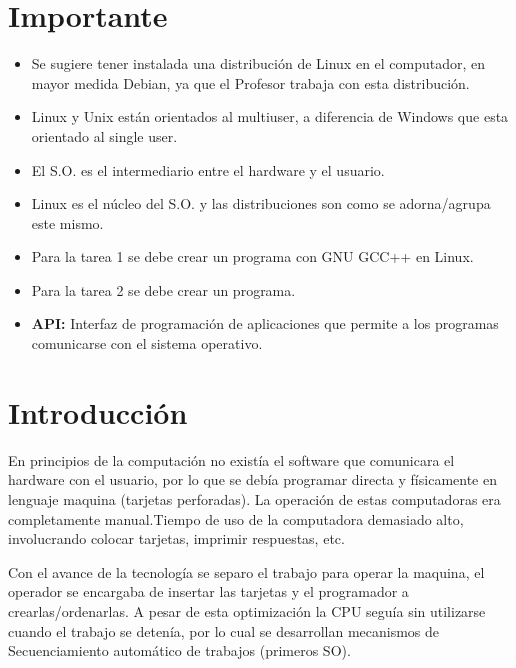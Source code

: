 \documentclass{templateNote}
\begin{document}


\portada
\margenes 
\tableofcontents
\newpage


\section{Importante}

\begin{itemize}
    \item Se sugiere tener instalada una distribución de Linux en el computador, en mayor medida Debian, ya que el Profesor trabaja con esta distribución.
    \item Linux y Unix están orientados al multiuser, a diferencia de Windows que esta orientado al single user.
    \item El S.O. es el intermediario entre el hardware y el usuario.
    \item Linux es el núcleo del S.O. y las distribuciones son como se adorna/agrupa este mismo.
    \item Para la tarea 1 se debe crear un programa con GNU GCC++ en Linux.
    \item Para la tarea 2 se debe crear un programa.
    \item \textbf{API:} Interfaz de programación de aplicaciones que permite a los programas comunicarse con el sistema operativo.
\end{itemize}

\newpage
\section{Introducción}
En principios de la computación no existía el software que comunicara el hardware con el usuario, por lo que se debía programar directa y físicamente en lenguaje maquina (tarjetas perforadas). La operación de estas computadoras era completamente manual.Tiempo de uso de la computadora demasiado alto, involucrando colocar tarjetas, imprimir respuestas, etc.

Con el avance de la tecnología se separo el trabajo para operar la maquina, el operador se encargaba de insertar las tarjetas y el programador a crearlas/ordenarlas. A pesar de esta optimización la CPU seguía sin utilizarse cuando el trabajo se detenía, por lo cual se desarrollan mecanismos de Secuenciamiento automático de trabajos (primeros SO).
\end{document}
